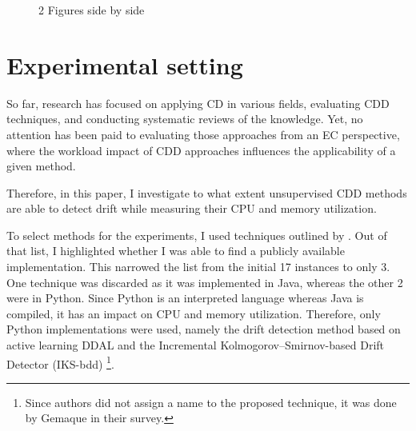 \documentclass[a4paper]{article}
\begin{document}
\begin{figure}%
    \centering
    \qquad
    \caption{2 Figures side by side}%
    \label{Rot_5_img}%
\end{figure} 

\section{Experimental setting}

So far, research has focused on applying CD in various fields, evaluating CDD techniques, and conducting systematic reviews of the knowledge. Yet, no attention has been paid to evaluating those approaches from an EC perspective, where the workload impact of CDD approaches influences the applicability of a given method.

Therefore, in this paper, I investigate to what extent unsupervised CDD methods are able to detect drift while measuring their CPU and memory utilization.

To select methods for the experiments, I used techniques outlined by \cite{gemaque_overview_2020}. Out of that list, I highlighted whether I was able to find a publicly available implementation. This narrowed the list from the initial 17 instances to only 3. One technique was discarded as it was implemented in Java, whereas the other 2 were in Python. Since Python is an interpreted language whereas Java is compiled, it has an impact on CPU and memory utilization. Therefore, only Python implementations were used, namely the drift detection method based on active learning DDAL \cite{costa_drift_2018} and the Incremental Kolmogorov–Smirnov-based Drift Detector (IKS-bdd) \cite{dos_reis_fast_2016} \footnote{Since authors did not assign a name to the proposed technique, it was done by Gemaque \cite{gemaque_overview_2020} in their survey.}. 
\end{document}
